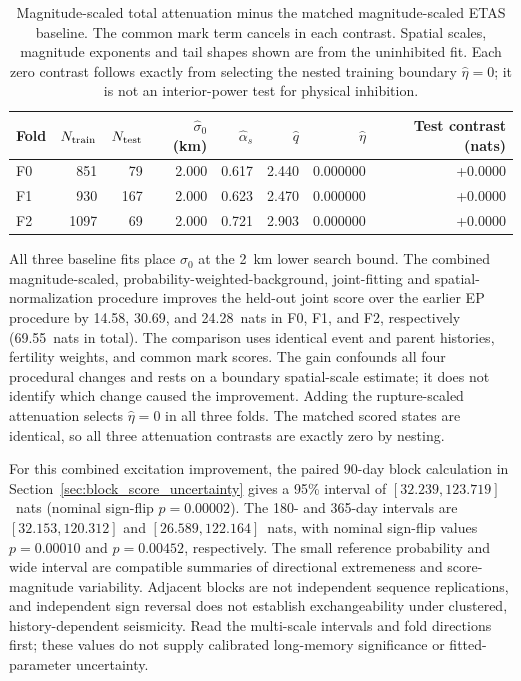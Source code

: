 \begin{table}[htbp]
\centering
\small
\begin{tabular}{lrrrrrrr}
\toprule
Fold & $N_{\rm train}$ & $N_{\rm test}$ & $\widehat\sigma_0$ (km) & $\widehat\alpha_s$ & $\widehat q$ & $\widehat\eta$ & Test contrast (nats) \\
\midrule
F0 & 851 & 79 & 2.000 & 0.617 & 2.440 & 0.000000 & +0.0000 \\
F1 & 930 & 167 & 2.000 & 0.623 & 2.470 & 0.000000 & +0.0000 \\
F2 & 1097 & 69 & 2.000 & 0.721 & 2.903 & 0.000000 & +0.0000 \\
\bottomrule
\end{tabular}
\caption{Magnitude-scaled total attenuation minus the matched magnitude-scaled
ETAS baseline. The common mark term cancels in each contrast. Spatial scales,
magnitude exponents and tail shapes shown are from the uninhibited fit. Each
zero contrast follows exactly from selecting the nested training boundary
$\hat\eta=0$; it is not an interior-power test for physical inhibition.}
\label{tab:epplus_benchmark}
\end{table}
All three baseline fits place $\sigma_0$ at the 2~km lower search bound. The combined magnitude-scaled, probability-weighted-background, joint-fitting and spatial-normalization procedure improves the held-out joint score over the earlier EP procedure by 14.58, 30.69, and 24.28~nats in F0, F1, and F2, respectively (69.55~nats in total). The comparison uses identical event and parent histories, fertility weights, and common mark scores. The gain confounds all four procedural changes and rests on a boundary spatial-scale estimate; it does not identify which change caused the improvement. Adding the rupture-scaled attenuation selects $\widehat\eta=0$ in all three folds. The matched scored states are identical, so all three attenuation contrasts are exactly zero by nesting.




For this combined excitation improvement, the paired 90-day block calculation in Section~\ref{sec:block_score_uncertainty} gives a 95\% interval of $[32.239,123.719]$~nats (nominal sign-flip $p=0.00002$). The 180- and 365-day intervals are $[32.153,120.312]$ and $[26.589,122.164]$~nats, with nominal sign-flip values $p=0.00010$ and $p=0.00452$, respectively. The small reference probability and wide interval are compatible summaries of directional extremeness and score-magnitude variability. Adjacent blocks are not independent sequence replications, and independent sign reversal does not establish exchangeability under clustered, history-dependent seismicity. Read the multi-scale intervals and fold directions first; these values do not supply calibrated long-memory significance or fitted-parameter uncertainty.
